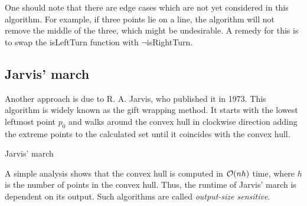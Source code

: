         One should note that there are edge cases which are not yet considered in this algorithm. For example, if three points lie on a line, the algorithm will not remove the middle of the three, which might be undesirable. A remedy for this is to swap the isLeftTurn function with $\neg$isRightTurn. 

    \subsection{Jarvis' march}
        Another approach is due to R. A. Jarvis, who published it in 1973. This algorithm is widely known as the gift wrapping method. It starts with the lowest leftmost point $p_0$ and walks around the convex hull in clockwise direction adding the extreme points to the calculated set until it coincides with the convex hull.

        \begin{breakablealgorithm}
            \caption{Jarvis' march}
            \label{alg:convex_hull_jarvis}
            \begin{algorithmic}[1]
                     
                     
                         
                    \EndWhile
                    \State{}
                \EndProcedure
            \end{algorithmic}
        \end{breakablealgorithm}

        A simple analysis shows that the convex hull is computed in $\mathcal{O}(nh)$ time, where $h$ is the number of points in the convex hull. Thus, the runtime of Jarvis' march is dependent on its output. Such algorithms are called \emph{output-size sensitive}.

